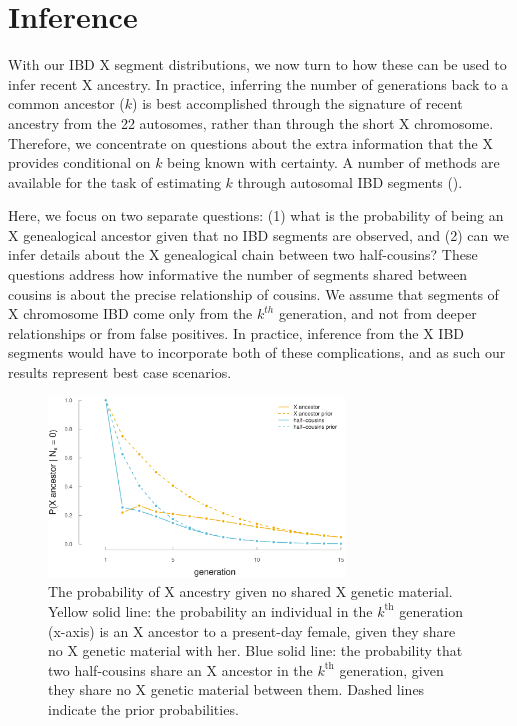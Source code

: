 \documentclass[11pt]{article}
\begin{document}
\section{Inference}
\label{sec:inf}

With our IBD X segment distributions, we now turn to how these can be used to
infer recent X ancestry. In practice, inferring the number of generations back
to a common ancestor ($k$) is best accomplished through the signature of recent
ancestry from the 22 autosomes, rather than through the short X chromosome.
Therefore, we concentrate on questions about the extra information that the X
provides conditional on $k$ being known with certainty. A number of methods are
available for the task of estimating $k$ through autosomal IBD segments
(\cite{huff2011maximum,Henn:2012ij,Durand010512}).

Here, we focus on two separate questions: (1) what is the probability of being
an X genealogical ancestor given that no IBD segments are observed, and (2) can
we infer details about the X genealogical chain between two half-cousins?
These questions address how informative the number of segments shared between
cousins is about the precise relationship of cousins. We assume that segments
of X chromosome IBD come only from the $k^{th}$ generation, and not from deeper
relationships or from false positives. In practice, inference from the X IBD
segments would have to incorporate both of these complications, and as such our
results represent best case scenarios.

\begin{figure}[!ht]
  \centering
  \includegraphics[width=0.7\textwidth]{images/prob-xanc-n0.eps}

  \caption{The probability of X ancestry given no shared X genetic material.
Yellow solid line: the probability an individual in the $k^\text{th}$
generation (x-axis) is an X ancestor to a present-day female, given they share
no X genetic material with her. Blue solid line: the probability that two
half-cousins share an X ancestor in the $k^\text{th}$ generation, given they
share no X genetic material between them. Dashed lines indicate the prior
probabilities.}

  \label{fig:prob-xanc-n0}
\end{figure}
\end{document}
